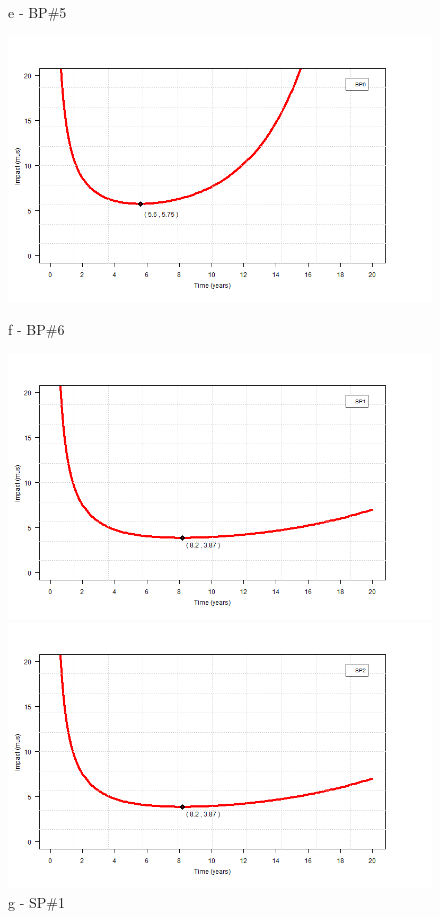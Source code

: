 \begin{figure}[!htb]
\begin{minipage}[b]{0.5\linewidth}
	\caption*{e - BP\#5}
\end{minipage}
	\hspace{0.05cm}
\begin{minipage}[b]{0.5\linewidth}
	\centering
	\includegraphics[width=\textwidth]{figures/ch05_fig_ois_pump6}
	\caption*{f - BP\#6}
\end{minipage}
	\hspace{0.05cm}
\begin{minipage}[b]{0.5\linewidth}
	\centering
	\includegraphics[width=\textwidth]{figures/ch05_fig_ois_pump7}
	\caption*{g -  SP\#1}
\end{minipage}
	\hspace{0.05cm}
\begin{minipage}[b]{0.5\linewidth}
	\centering
	\includegraphics[width=\textwidth]{figures/ch05_fig_ois_pump8}

\end{minipage}
\end{figure}
